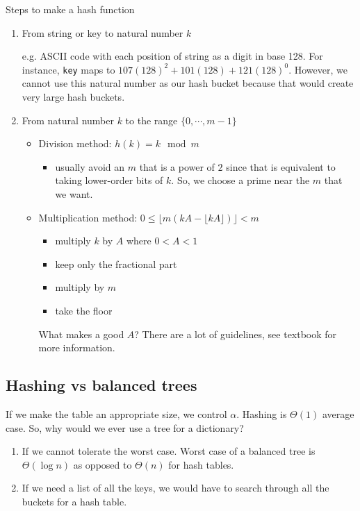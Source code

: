 \documentclass[11pt]{article}
\begin{document}
Steps to make a hash function 
\begin{enumerate}
    \item From string or key to natural number $k$
    
    e.g. ASCII code with each position of string as a digit in base 128. For instance, \texttt{key} maps to $107(128)^2 + 101(128) + 121(128)^0$. However, we cannot use this natural number as our hash bucket because that would create very large hash buckets. 
    
    \item From natural number $k$ to the range $\{0, \cdots, m-1\}$
    
    \begin{itemize}
        \item Division method: $h(k) = k\mod m$
        \begin{itemize}
            \item usually avoid an $m$ that is a power of $2$ since that is equivalent to taking lower-order bits of $k$. So, we choose a prime near the $m$ that we want. 
        \end{itemize}
        \item Multiplication method: $0 \leq \lfloor m(kA - \lfloor kA \rfloor) \rfloor < m $
        \begin{itemize}
            \item multiply $k$ by $A$ where $0 < A < 1$
            \item keep only the fractional part 
            \item multiply by $m$ 
            \item take the floor
        \end{itemize}
        What makes a good $A$? There are a lot of guidelines, see textbook for more information. 
    \end{itemize}
\end{enumerate}

\subsection{Hashing vs balanced trees}
If we make the table an appropriate size, we control $\alpha$. Hashing is $\Theta(1)$ average case. So, why would we ever use a tree for a dictionary? 
\begin{enumerate}
    \item If we cannot tolerate the worst case. Worst case of a balanced tree is $\Theta(\log n)$ as opposed to $\Theta(n)$ for hash tables.  
    \item If we need a list of all the keys, we would have to search through all the buckets for a hash table. 
\end{enumerate}
\end{document}
